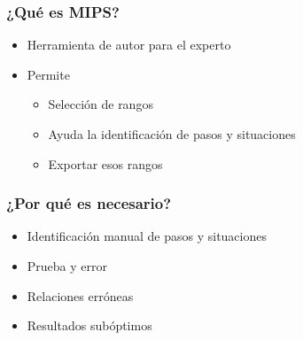 \begin{frame}
	\frametitle{¿Qu\'e es MIPS?}
	
	\begin{itemize}
		\item Herramienta de autor para el experto
		\item Permite
		\begin{itemize}
			\item Selecci\'on de rangos
			\item Ayuda la identificaci\'on de pasos y situaciones
			\item Exportar esos rangos
		\end{itemize}
	\end{itemize}
\end{frame}

\begin{frame}
	\frametitle{¿Por qu\'e es necesario?}
	
	\begin{itemize}
		\item Identificaci\'on manual de pasos y situaciones
		\item Prueba y error
		\item Relaciones err\'oneas
		\item Resultados sub\'optimos
	\end{itemize}
\end{frame}
